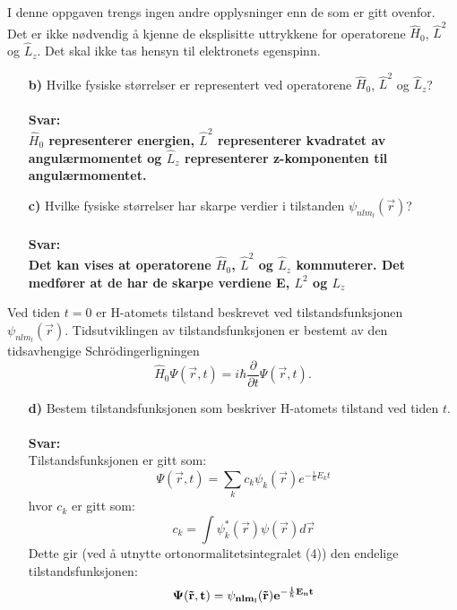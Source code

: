 \documentclass[11pt,a4paper]{report}
\newcounter{excount}[chapter]
\newenvironment{exercise}[1][]{\addtocounter{excount}{1} \noindent {\bf Oppgave
    \arabic{excount} \ \ #1}\hspace{2mm}}{\vspace{4mm}}
\begin{document}
\begin{exercise}[\\]
I denne oppgaven trengs ingen andre opplysninger enn de som er gitt ovenfor. Det er ikke n{\o}dvendig {\aa} kjenne de eksplisitte uttrykkene for operatorene $\hat{H}_0$, $ \hat{L}^2$ og $\hat{L}_z$. Det skal ikke tas hensyn til elektronets egenspinn.
\begin{itemize}
%
\item[\bf b)] Hvilke fysiske st{\o}rrelser er representert ved operatorene $\hat{H}_{0}$, $\hat{L}^2$ og $\hat{L}_z$?\\
\\
\textbf{Svar:\\
$\hat{H}_{0}$ representerer energien, $\hat{L}^2$ representerer kvadratet av angulærmomentet og $\hat{L}_z$ representerer z-komponenten til angulærmomentet.}

\item[\bf c)] Hvilke fysiske st{\o}rrelser har skarpe verdier i tilstanden $\psi_{n l m_{l}}(\vec{r})$?\\
\\
\textbf{Svar:\\
Det kan vises at operatorene $\hat{H}_{0}$, $\hat{L}^2$ og $\hat{L}_z$ kommuterer. Det medfører at de har de skarpe verdiene E, $L^2$ og $L_z$}

\end{itemize}

\noindent
Ved tiden $t = 0$ er H-atomets tilstand beskrevet ved tilstandsfunksjonen
$\psi_{n l m_{l}}(\vec{r})$. Tidsutviklingen av tilstandsfunksjonen er bestemt
av den tidsavhengige Schr\"{o}dingerligningen
\begin{equation}
\hat{H}_{0} \Psi (\vec{r}, t) = i\hbar \frac{\partial }{\partial t} \Psi (\vec{r}, t).
\end{equation}
\begin{itemize}
\item[\bf d)] Bestem tilstandsfunksjonen som beskriver H-atomets tilstand ved tiden $t$.\\
\\
\textbf{Svar:}\\
Tilstandsfunksjonen er gitt som:
\begin{equation}
\Psi(\vec{r},t) = \sum_{k}c_{k}\psi_{k}(\vec{r})e^{-\frac{i}{\hbar}E_{k}t}
\end{equation}
hvor $c_{k}$ er gitt som:
\begin{equation}
c_{k} = \int\psi_{k}^{\ast}(\vec{r})\psi(\vec{r})d\vec{r}
\end{equation}
Dette gir (ved å utnytte ortonormalitetsintegralet (4)) den endelige tilstandsfunksjonen:
\begin{equation}
\bf \Psi(\vec{r},t) = \psi_{nlm_{l}}(\vec{r})e^{-\frac{i}{\hbar}E_{n}t}
\end{equation}


\end{itemize}
\end{exercise}
\end{document}
